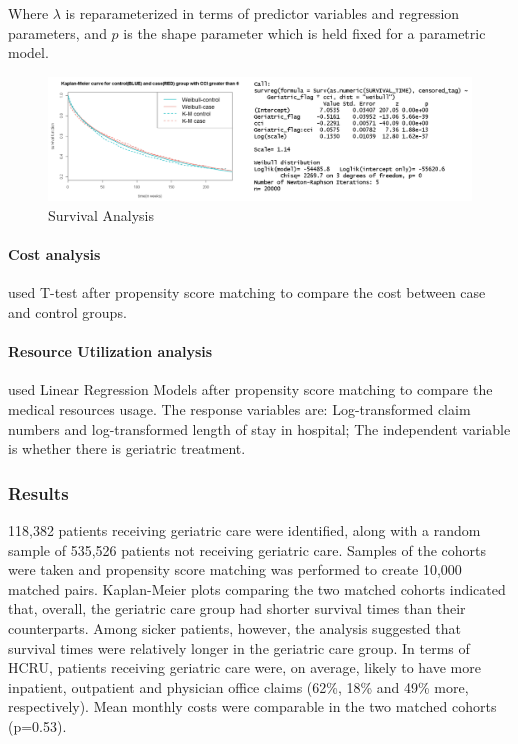 \documentclass{article}
\begin{document}
	Where $\lambda$ is reparameterized in terms of predictor variables and regression parameters, and $p$ is the shape parameter which is held fixed for a parametric model.
	
	\begin{figure}[h]
		\centering
		\includegraphics[width=1\textwidth]{TrinitySurvival}
		\caption{Survival Analysis}
	\end{figure}
	
	\paragraph{Cost analysis}used T-test after propensity score matching to compare the cost between case and control groups. 
	\paragraph{Resource Utilization analysis} used Linear Regression Models after propensity score matching to compare the medical resources usage. The response variables are: Log-transformed claim numbers and log-transformed length of stay in hospital; The independent variable is whether there is geriatric treatment.
	
	\subsubsection{Results}
	118,382 patients receiving geriatric care were identified, along with a random sample of 535,526 patients not receiving geriatric care. Samples of the cohorts were taken and propensity score matching was performed to create 10,000 matched pairs. Kaplan-Meier plots comparing the two matched cohorts indicated that, overall, the geriatric care group had shorter survival times than their counterparts. Among sicker patients, however, the analysis suggested that survival times were relatively longer in the geriatric care group. In terms of HCRU, patients receiving geriatric care were, on average, likely to have more inpatient, outpatient and physician office claims (62\%, 18\% and 49\% more, respectively). Mean monthly costs were comparable in the two matched cohorts (p=0.53).
	
\end{document}
